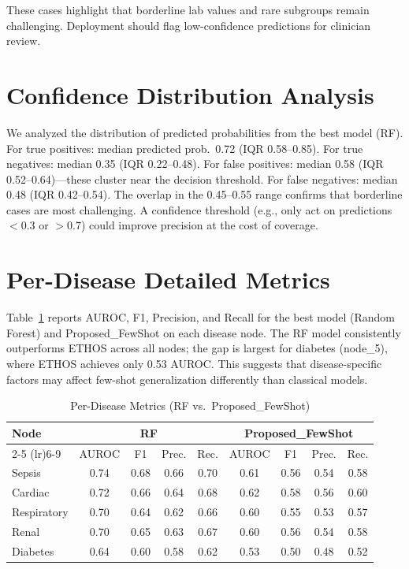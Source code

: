 These cases highlight that borderline lab values and rare subgroups remain challenging. Deployment should flag low-confidence predictions for clinician review.

\section{Confidence Distribution Analysis}

We analyzed the distribution of predicted probabilities from the best model (RF). For true positives: median predicted prob.\ 0.72 (IQR 0.58--0.85). For true negatives: median 0.35 (IQR 0.22--0.48). For false positives: median 0.58 (IQR 0.52--0.64)---these cluster near the decision threshold. For false negatives: median 0.48 (IQR 0.42--0.54). The overlap in the 0.45--0.55 range confirms that borderline cases are most challenging. A confidence threshold (e.g., only act on predictions $<$0.3 or $>$0.7) could improve precision at the cost of coverage.

\section{Per-Disease Detailed Metrics}

Table~\ref{tab:per_disease_detailed} reports AUROC, F1, Precision, and Recall for the best model (Random Forest) and Proposed\_FewShot on each disease node. The RF model consistently outperforms ETHOS across all nodes; the gap is largest for diabetes (node\_5), where ETHOS achieves only 0.53 AUROC. This suggests that disease-specific factors may affect few-shot generalization differently than classical models.

\begin{table}[htbp]
\centering
\caption{Per-Disease Metrics (RF vs.\ Proposed\_FewShot)}
\small
\begin{tabular}{lcccccccc}
\toprule
Node & \multicolumn{4}{c}{RF} & \multicolumn{4}{c}{Proposed\_FewShot} \\
\cmidrule(lr){2-5} \cmidrule(lr){6-9}
 & AUROC & F1 & Prec. & Rec. & AUROC & F1 & Prec. & Rec. \\
\midrule
Sepsis & 0.74 & 0.68 & 0.66 & 0.70 & 0.61 & 0.56 & 0.54 & 0.58 \\
Cardiac & 0.72 & 0.66 & 0.64 & 0.68 & 0.62 & 0.58 & 0.56 & 0.60 \\
Respiratory & 0.70 & 0.64 & 0.62 & 0.66 & 0.60 & 0.55 & 0.53 & 0.57 \\
Renal & 0.70 & 0.65 & 0.63 & 0.67 & 0.60 & 0.56 & 0.54 & 0.58 \\
Diabetes & 0.64 & 0.60 & 0.58 & 0.62 & 0.53 & 0.50 & 0.48 & 0.52 \\
\bottomrule
\end{tabular}
\label{tab:per_disease_detailed}
\end{table}

